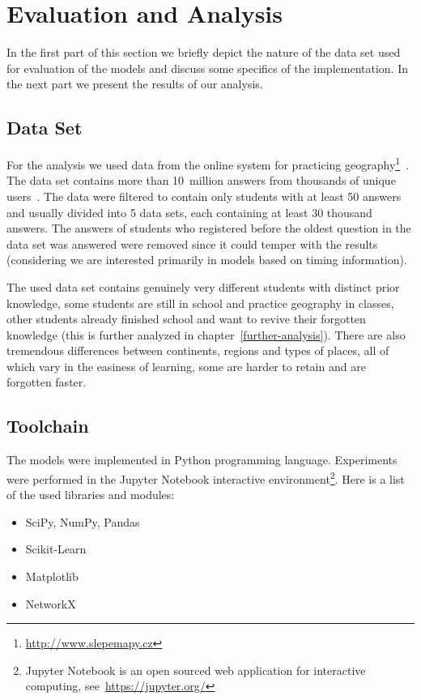 \chapter{Evaluation and Analysis}

In the first part of this section we briefly depict the nature of the data set used for evaluation of the models and discuss some specifics of the implementation. In the next part we present the results of our analysis.

\section{Data Set}

For the analysis we used data from the online system for practicing geography\footnote{\url{http://www.slepemapy.cz}}~\cite{Papousek2014}. The data set contains more than 10~million answers from thousands of unique users~\cite{Papousek2015}. The data were filtered to contain only students with at least 50 answers and usually divided into 5 data sets, each containing at least 30 thousand answers. The answers of students who registered before the oldest question in the data set was answered were removed since it could temper with the results (considering we are interested primarily in models based on timing information).

The used data set contains genuinely very different students with distinct prior knowledge, some students are still in school and practice geography in classes, other students already finished school and want to revive their forgotten knowledge (this is further analyzed in chapter~\ref{further-analysis}). There are also tremendous differences between continents, regions and types of places, all of which vary in the easiness of learning, some are harder to retain and are forgotten faster.

\section{Toolchain}

The models were implemented in Python programming language. Experiments were performed in the Jupyter Notebook interactive environment\footnote{Jupyter Notebook is an open sourced web application for interactive computing, see~\url{https://jupyter.org/}}. Here is a list of the used libraries and modules:

\begin{itemize}
  \item SciPy, NumPy, Pandas
  \item Scikit-Learn
  \item Matplotlib
  \item NetworkX
\end{itemize}

